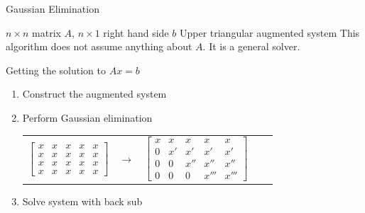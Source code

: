 \documentclass[10pt]{beamer}
\begin{document}
\begin{frame}{Gaussian Elimination}

{
{ $n\times n$ matrix $A$, $n \times 1$ right hand side $b$ }
{Upper triangular augmented system}
{This algorithm does not assume anything about $A$. It is a general solver. }}


\begin{block}{Getting the solution to $Ax=b$}
\begin{enumerate}

\item Construct the augmented system 

\item Perform Gaussian elimination
\begin{center}
	\renewcommand{\arraystretch}{1.3}
	\small
	\begin{tabular}{ccccc}
        $\begin{bmatrix}   x  & x & x & x & x \\
                           x  & x  & x  & x  & x  \\
                           x  & x  & x  & x  & x \\
                           x  & x  & x  & x  & x \end{bmatrix}$
		& $\longrightarrow$ &
		$\begin{bmatrix} x & x  &  x   & x    & x   \\
						 0 & x' &  x'  & x'   & x'  \\
						 0 & 0  &  x'' & x''  & x'' \\
						 0 & 0  &  0   & x''' & x''' \end{bmatrix}$ 
	\end{tabular}
\end{center}
\item Solve system with back sub 
\end{enumerate}
\end{block}
\end{frame}
\end{document}
